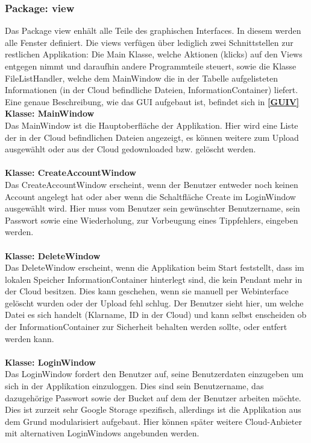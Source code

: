 \documentclass[13pt,a4paper,bibliography=totocnumbered,listof=totocnumbered]{scrartcl}
\newcommand*{\fullref}[1]{\textbf{\hyperref[{#1}]{\ref*{#1} \nameref*{#1}}}}
\begin{document}
\subsubsection{Package: view}
Das Package view enhält alle Teile des graphischen Interfaces. In diesem werden alle Fenster definiert. Die views verfügen über lediglich zwei Schnittstellen zur restlichen Applikation: Die Main Klasse, welche Aktionen (klicks) auf den Views entgegen nimmt und daraufhin andere Programmteile steuert, sowie die Klasse FileListHandler, welche dem MainWindow die in der Tabelle aufgelisteten Informationen (in der Cloud befindliche Dateien, InformationContainer) liefert. Eine genaue Beschreibung, wie das GUI aufgebaut ist, befindet sich in \fullref{GUIV}\\
\textbf{Klasse: MainWindow}\\
Das MainWindow ist die Hauptoberfläche der Applikation. Hier wird eine Liste der in der Cloud befindlichen Dateien angezeigt, es können weitere zum Upload ausgewählt oder aus der Cloud gedownloaded bzw. gelöscht werden.\\\\
\textbf{Klasse: CreateAccountWindow}\\
Das CreateAccountWindow erscheint, wenn der Benutzer entweder noch keinen Account angelegt hat oder aber wenn die Schaltfläche Create im LoginWindow ausgewählt wird. Hier muss vom Benutzer sein gewünschter Benutzername, sein Passwort sowie eine Wiederholung, zur Vorbeugung eines Tippfehlers, eingeben werden.\\\\
\textbf{Klasse: DeleteWindow}\\
Das DeleteWindow erscheint, wenn die Applikation beim Start feststellt, dass im lokalen Speicher InformationContainer hinterlegt sind, die kein Pendant mehr in der Cloud besitzen. Dies kann geschehen, wenn sie manuell per Webinterface gelöscht wurden oder der Upload fehl schlug. Der Benutzer sieht hier, um welche Datei es sich handelt (Klarname, ID in der Cloud) und kann selbst enscheiden ob der InformationContainer zur Sicherheit behalten werden sollte, oder entfert werden kann.\\\\
\textbf{Klasse: LoginWindow}\\
Das LoginWindow fordert den Benutzer auf, seine Benutzerdaten einzugeben um sich in der Applikation einzuloggen. Dies sind sein Benutzername, das dazugehörige Passwort sowie der Bucket auf dem der Benutzer arbeiten möchte. Dies ist zurzeit sehr Google Storage spezifisch, allerdings ist die Applikation aus dem Grund modularisiert aufgebaut. Hier können später weitere Cloud-Anbieter mit alternativen LoginWindows angebunden werden.\\\\
\end{document}
